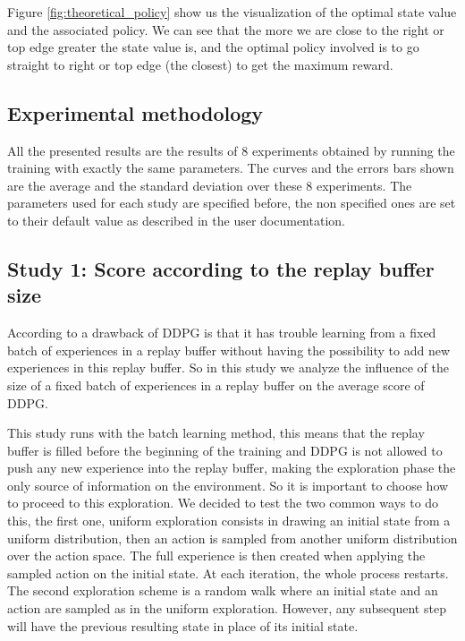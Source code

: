 \documentclass{article}
\begin{document}
Figure \ref{fig:theoretical_policy} show us the visualization of the optimal state value and the associated policy. We can see that the more we are close to the right or top edge greater the state value is, and the optimal policy involved is to go straight to right or top edge (the closest) to get the maximum reward.

\subsection{Experimental methodology}

All the presented results are the results of 8 experiments obtained by running the training with exactly the same parameters. The curves and the errors bars shown are the average and the standard deviation over these 8 experiments. The parameters used for each study are specified before, the non specified ones are set to their default value as described in the user documentation.

\subsection{Study 1: Score according to the replay buffer size}

According to \cite{fujimoto_off-policy_2018} a drawback of DDPG is that it has trouble learning from a fixed batch of experiences in a replay buffer without having the possibility to add new experiences in this replay buffer. So in this study we analyze the influence of the size of a fixed batch of experiences in a replay buffer on the average score of DDPG.

This study runs with the batch learning method, this means that the replay buffer is filled before the beginning of the training and DDPG is not allowed to push any new experience into the replay buffer, making the exploration phase the only source of information on the environment. So it is important to choose how to proceed to this exploration. We decided to test the two common ways to do this, the first one, uniform exploration consists in drawing an initial state from a uniform distribution, then an action is sampled from another uniform distribution over the action space. The full experience is then created when applying the sampled action on the initial state. At each iteration, the whole process restarts. The second exploration scheme is a random walk where an initial state and an action are sampled as in the uniform exploration. However, any subsequent step will have the previous resulting state in place of its initial state.
\end{document}
